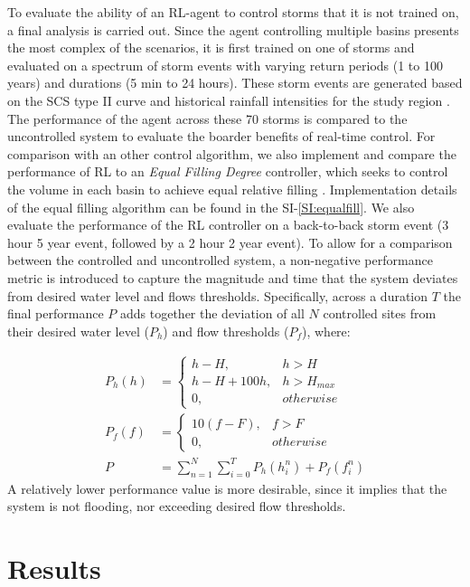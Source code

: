 To evaluate the ability of an RL-agent to control storms that it is not trained on, a final analysis is carried out.
Since the agent controlling multiple basins presents the most complex of the scenarios, it is first trained on one of storms and evaluated on a spectrum of storm events with varying return periods (1 to 100 years) and durations (5 min to 24 hours).
These storm events are generated based on the SCS type II curve and historical rainfall intensities for the study region \cite{scs1986urban}.
The performance of the agent across these 70 storms is compared to the uncontrolled system to evaluate the boarder benefits of real-time control.
For comparison with an other control algorithm, we also implement and compare the performance of RL to an \textit{Equal Filling Degree} controller, which seeks to control the volume in each basin to achieve equal relative filling \cite{Schutze2017}. Implementation details of the equal filling algorithm can be found in the SI-\ref{SI:equalfill}.
We also evaluate the performance of the RL controller on a back-to-back storm event (3 hour 5 year event, followed by a 2 hour 2 year event).
To allow for a comparison between the controlled and uncontrolled system, a non-negative performance metric is introduced to capture the magnitude and time that the system deviates from desired water level and flows thresholds.
Specifically, across a duration $T$ the final performance $P$ adds together the deviation of all $N$ controlled sites from their desired water level ($P_h$) and flow thresholds ($P_f$), where:


\begin{align}
	P_h(h) &= \begin{cases}h-H, & h>H \\ h-H+100h,  &h>H_{max} \\0, & otherwise\end{cases} \\
	P_f(f) &= \begin{cases}10(f -F), & f>F \\0, & otherwise\end{cases} \\
	P &= \sum_{n=1}^N \sum_{i=0}^T P_h (h_i^n ) + P_f (f_i^n ) \label{perf_met}
\end{align}
A relatively lower performance value is more desirable, since it implies that the system is not flooding, nor exceeding desired flow thresholds.

\section{Results}

